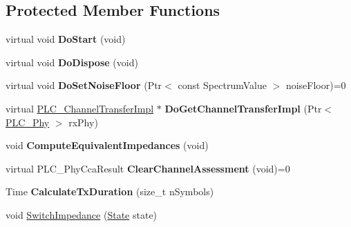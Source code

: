 \subsection*{\-Protected \-Member \-Functions}
\begin{DoxyCompactItemize}
\item 
\hypertarget{classns3_1_1PLC__HalfDuplexOfdmPhy_a4ccdaa92b8f91a0530da9bba78d4f4ee}{virtual void {\bfseries \-Do\-Start} (void)}\label{classns3_1_1PLC__HalfDuplexOfdmPhy_a4ccdaa92b8f91a0530da9bba78d4f4ee}

\item 
\hypertarget{classns3_1_1PLC__HalfDuplexOfdmPhy_a4426554b2fc88ca89ebe521b1229dd01}{virtual void {\bfseries \-Do\-Dispose} (void)}\label{classns3_1_1PLC__HalfDuplexOfdmPhy_a4426554b2fc88ca89ebe521b1229dd01}

\item 
\hypertarget{classns3_1_1PLC__HalfDuplexOfdmPhy_ad83e7c2c13d9c39fd3c0edf6d9fef730}{virtual void {\bfseries \-Do\-Set\-Noise\-Floor} (\-Ptr$<$ const \-Spectrum\-Value $>$ noise\-Floor)=0}\label{classns3_1_1PLC__HalfDuplexOfdmPhy_ad83e7c2c13d9c39fd3c0edf6d9fef730}

\item 
\hypertarget{classns3_1_1PLC__HalfDuplexOfdmPhy_a45fe71a9301d4e0824729664f7cf69f0}{virtual \hyperlink{classns3_1_1PLC__ChannelTransferImpl}{\-P\-L\-C\-\_\-\-Channel\-Transfer\-Impl} $\ast$ {\bfseries \-Do\-Get\-Channel\-Transfer\-Impl} (\-Ptr$<$ \hyperlink{classns3_1_1PLC__Phy}{\-P\-L\-C\-\_\-\-Phy} $>$ rx\-Phy)}\label{classns3_1_1PLC__HalfDuplexOfdmPhy_a45fe71a9301d4e0824729664f7cf69f0}

\item 
\hypertarget{classns3_1_1PLC__HalfDuplexOfdmPhy_a90f00571701cf79b3c3ee3d61d48b4cb}{void {\bfseries \-Compute\-Equivalent\-Impedances} (void)}\label{classns3_1_1PLC__HalfDuplexOfdmPhy_a90f00571701cf79b3c3ee3d61d48b4cb}

\item 
\hypertarget{classns3_1_1PLC__HalfDuplexOfdmPhy_a544c0c9fba81da60a7fc3974e72d2f2c}{virtual \-P\-L\-C\-\_\-\-Phy\-Cca\-Result {\bfseries \-Clear\-Channel\-Assessment} (void)=0}\label{classns3_1_1PLC__HalfDuplexOfdmPhy_a544c0c9fba81da60a7fc3974e72d2f2c}

\item 
\hypertarget{classns3_1_1PLC__HalfDuplexOfdmPhy_a16d8bb82f9d9261e1de673cf88649512}{\-Time {\bfseries \-Calculate\-Tx\-Duration} (size\-\_\-t n\-Symbols)}\label{classns3_1_1PLC__HalfDuplexOfdmPhy_a16d8bb82f9d9261e1de673cf88649512}

\item 
void \hyperlink{classns3_1_1PLC__HalfDuplexOfdmPhy_afff34328dc4f9eb43f856f9219992889}{\-Switch\-Impedance} (\hyperlink{classns3_1_1PLC__HalfDuplexOfdmPhy_ae91e168f9a51bf5344e7e03d9ae13b60}{\-State} state)
\end{DoxyCompactItemize}
